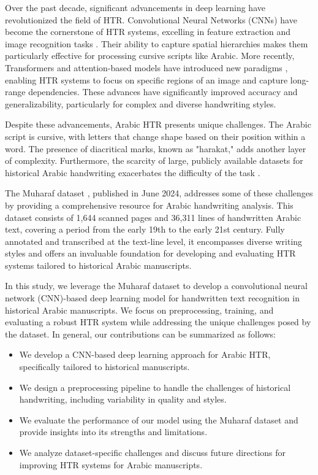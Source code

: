 \documentclass[conference]{IEEEtran}
\begin{document}
Over the past decade, significant advancements in deep learning have revolutionized the field of HTR. Convolutional Neural Networks (CNNs) have become the cornerstone of HTR systems, excelling in feature extraction and image recognition tasks \cite{mosbah2024adocrnet, alrobah2022arabic, altwaijry2021arabic}. Their ability to capture spatial hierarchies makes them particularly effective for processing cursive scripts like Arabic. More recently, Transformers and attention-based models have introduced new paradigms \cite{wang2020decoupled, li2023trocr, bhunia2021metahtr }, enabling HTR systems to focus on specific regions of an image and capture long-range dependencies. These advances have significantly improved accuracy and generalizability, particularly for complex and diverse handwriting styles.

Despite these advancements, Arabic HTR presents unique challenges. The Arabic script is cursive, with letters that change shape based on their position within a word. The presence of diacritical marks, known as "harakat," adds another layer of complexity. Furthermore, the scarcity of large, publicly available datasets for historical Arabic handwriting exacerbates the difficulty of the task \cite{saeed2024muharaf}.


The Muharaf dataset \cite{saeed2024muharaf}, published in June 2024, addresses some of these challenges by providing a comprehensive resource for Arabic handwriting analysis. This dataset consists of 1,644 scanned pages and 36,311 lines of handwritten Arabic text, covering a period from the early 19th to the early 21st century. Fully annotated and transcribed at the text-line level, it encompasses diverse writing styles and offers an invaluable foundation for developing and evaluating HTR systems tailored to historical Arabic manuscripts.

In this study, we leverage the Muharaf dataset to develop a convolutional neural network (CNN)-based deep learning model for handwritten text recognition in historical Arabic manuscripts. We focus on preprocessing, training, and evaluating a robust HTR system while addressing the unique challenges posed by the dataset. In general, our contributions can be summarized as follows:

\begin{itemize}
    \item We develop a CNN-based deep learning approach for Arabic HTR, specifically tailored to historical manuscripts.
    \item We design a preprocessing pipeline to handle the challenges of historical handwriting, including variability in quality and styles.
    \item We evaluate the performance of our model using the Muharaf dataset and provide insights into its strengths and limitations.
    \item We analyze dataset-specific challenges and discuss future directions for improving HTR systems for Arabic manuscripts.
\end{itemize}
\end{document}
